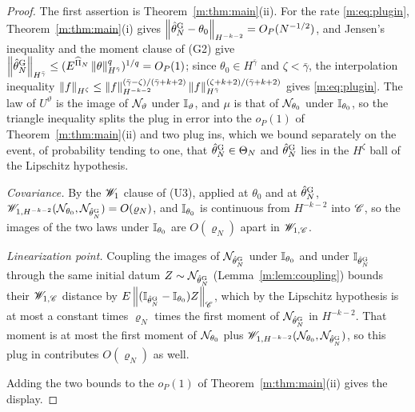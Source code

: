 \begin{proof}
The first assertion is Theorem~\ref{m:thm:main}(ii). For the rate \eqref{m:eq:plugin}, Theorem~\ref{m:thm:main}(i) gives $\left\|\hat\theta^{\rm G}_N-\theta_0\right\|_{H^{-k-2}}=O_P(N^{-1/2})$, and Jensen's inequality and the moment clause of (G2) give $\left\|\hat\theta^{\rm G}_N\right\|_{H^{\bar\gamma}}\le(E^{\widehat\Pi_N}\left\|\theta\right\|^q_{H^{\bar\gamma}})^{1/q}=O_P(1)$; since $\theta_0\in H^{\bar\gamma}$ and $\zeta<\bar\gamma$, the interpolation inequality $\left\|f\right\|_{H^\zeta}\le\left\|f\right\|_{H^{-k-2}}^{(\bar\gamma-\zeta)/(\bar\gamma+k+2)}\left\|f\right\|_{H^{\bar\gamma}}^{(\zeta+k+2)/(\bar\gamma+k+2)}$ gives \eqref{m:eq:plugin}. The law of $U^\vartheta$ is the image of $\mathcal{N}_\vartheta$ under $\mathbb{I}_\vartheta$, and $\mu$ is that of $\mathcal{N}_{\theta_0}$ under $\mathbb{I}_{\theta_0}$, so the triangle inequality splits the plug in error into the $o_P(1)$ of Theorem~\ref{m:thm:main}(ii) and two plug ins, which we bound separately on the event, of probability tending to one, that $\hat\theta^{\rm G}_N\in\Theta_N$ and $\hat\theta^{\rm G}_N$ lies in the $H^\zeta$ ball of the Lipschitz hypothesis.

\emph{Covariance.} By the $\mathscr{W}_1$ clause of (U3), applied at $\theta_0$ and at $\hat\theta^{\rm G}_N$, $\mathscr{W}_{1,H^{-k-2}}(\mathcal{N}_{\theta_0},\mathcal{N}_{\hat\theta^{\rm G}_N})=O(\varrho_N)$, and $\mathbb{I}_{\theta_0}$ is continuous from $H^{-k-2}$ into $\mathscr{C}$, so the images of the two laws under $\mathbb{I}_{\theta_0}$ are $O(\varrho_N)$ apart in $\mathscr{W}_{1,\mathscr{C}}$.

\emph{Linearization point.} Coupling the images of $\mathcal{N}_{\hat\theta^{\rm G}_N}$ under $\mathbb{I}_{\theta_0}$ and under $\mathbb{I}_{\hat\theta^{\rm G}_N}$ through the same initial datum $Z\sim\mathcal{N}_{\hat\theta^{\rm G}_N}$ (Lemma~\ref{m:lem:coupling}) bounds their $\mathscr{W}_{1,\mathscr{C}}$ distance by $E\left\|(\mathbb{I}_{\hat\theta^{\rm G}_N}-\mathbb{I}_{\theta_0})Z\right\|_{\mathscr{C}}$, which by the Lipschitz hypothesis is at most a constant times $\varrho_N$ times the first moment of $\mathcal{N}_{\hat\theta^{\rm G}_N}$ in $H^{-k-2}$. That moment is at most the first moment of $\mathcal{N}_{\theta_0}$ plus $\mathscr{W}_{1,H^{-k-2}}(\mathcal{N}_{\theta_0},\mathcal{N}_{\hat\theta^{\rm G}_N})$, so this plug in contributes $O(\varrho_N)$ as well.

Adding the two bounds to the $o_P(1)$ of Theorem~\ref{m:thm:main}(ii) gives the display.
\end{proof}

